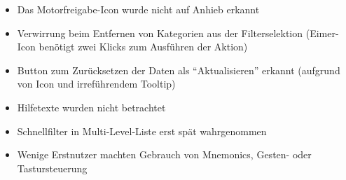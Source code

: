 \begin{itemize}
 \item Das Motorfreigabe-Icon wurde nicht auf Anhieb erkannt
 \item Verwirrung beim Entfernen von Kategorien aus der Filterselektion (Eimer-Icon benötigt zwei Klicks zum Ausführen der Aktion)
\end{itemize}
\begin{itemize}
 \item Button zum Zurücksetzen der Daten als \enquote{Aktualisieren} erkannt (aufgrund von Icon und irreführendem Tooltip)
\end{itemize}
\begin{itemize}
 \item Hilfetexte wurden nicht betrachtet
 \item Schnellfilter in Multi-Level-Liste erst spät wahrgenommen
 \item Wenige Erstnutzer machten Gebrauch von Mnemonics, Gesten- oder Tastursteuerung
\end{itemize}